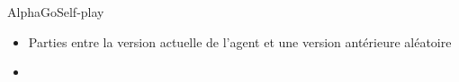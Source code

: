 \begin{frame}{AlphaGo}{Self-play}

	\begin{itemize}
		\item Parties entre la version actuelle de l'agent et une version antérieure aléatoire
		\item
	\end{itemize}

\end{frame}

